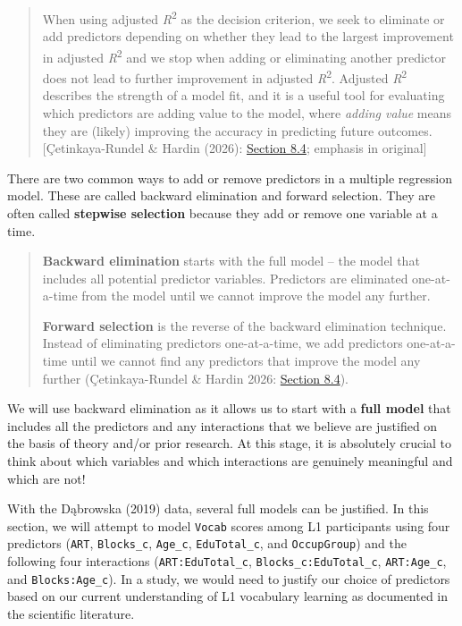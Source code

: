 \documentclass[
  letterpaper,
  DIV=11,
  numbers=noendperiod]{scrreprt}
\begin{document}
\begin{quote}
When using adjusted \emph{R}\textsuperscript{2} as the decision
criterion, we seek to eliminate or add predictors depending on whether
they lead to the largest improvement in adjusted
\emph{R}\textsuperscript{2} and we stop when adding or eliminating
another predictor does not lead to further improvement in adjusted
\emph{R}\textsuperscript{2}. Adjusted \emph{R}\textsuperscript{2}
describes the strength of a model fit, and it is a useful tool for
evaluating which predictors are adding value to the model, where
\emph{adding value} means they are (likely) improving the accuracy in
predicting future outcomes. {[}Çetinkaya-Rundel \& Hardin (2026):
\href{https://openintro-ims.netlify.app/model-mlr\#sec-model-selection}{Section
8.4}; emphasis in original{]}
\end{quote}

There are two common ways to add or remove predictors in a multiple
regression model. These are called backward elimination and forward
selection. They are often called \textbf{stepwise selection} because
they add or remove one variable at a time.

\begin{quote}
\textbf{Backward elimination} starts with the full model -- the model
that includes all potential predictor variables. Predictors are
eliminated one-at-a-time from the model until we cannot improve the
model any further.

\textbf{Forward selection} is the reverse of the backward elimination
technique. Instead of eliminating predictors one-at-a-time, we add
predictors one-at-a-time until we cannot find any predictors that
improve the model any further (Çetinkaya-Rundel \& Hardin 2026:
\href{https://openintro-ims.netlify.app/model-mlr\#sec-model-selection}{Section
8.4}).
\end{quote}

We will use backward elimination as it allows us to start with a
\textbf{full model} that includes all the predictors and any
interactions that we believe are justified on the basis of theory and/or
prior research. At this stage, it is absolutely crucial to think about
which variables and which interactions are genuinely meaningful and
which are not!

With the Dąbrowska (2019) data, several full models can be justified. In
this section, we will attempt to model \texttt{Vocab} scores among L1
participants using four predictors (\texttt{ART}, \texttt{Blocks\_c},
\texttt{Age\_c}, \texttt{EduTotal\_c}, and \texttt{OccupGroup}) and the
following four interactions (\texttt{ART:EduTotal\_c},
\texttt{Blocks\_c:EduTotal\_c}, \texttt{ART:Age\_c}, and
\texttt{Blocks:Age\_c}). In a study, we would need to justify our choice
of predictors based on our current understanding of L1 vocabulary
learning as documented in the scientific literature.
\end{document}
